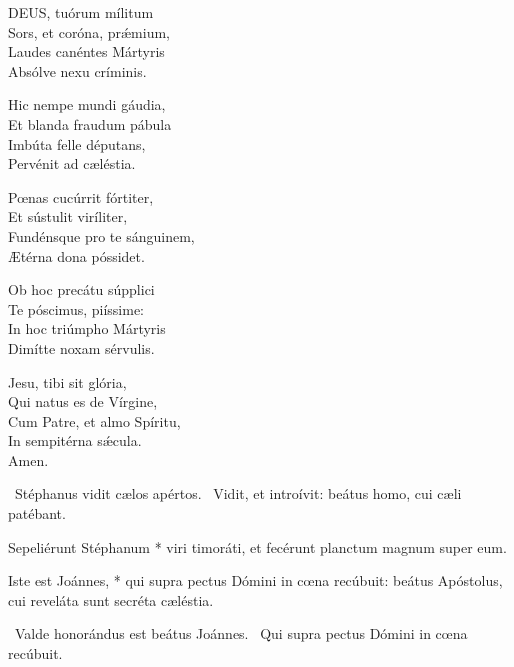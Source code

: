 \lettrine[lines=2]{D}{EUS}, tuórum mílitum\\
Sors, et coróna, prǽmium,\\
Laudes canéntes Mártyris\\
Absólve nexu críminis.

Hic nempe mundi gáudia,\\
Et blanda fraudum pábula\\
Imbúta felle députans,\\
Pervénit ad cæléstia.

Pœnas cucúrrit fórtiter,\\
Et sústulit viríliter,\\
Fundénsque pro te sánguinem,\\
Ætérna dona póssidet.

Ob hoc precátu súpplici\\
Te póscimus, piíssime:\\
In hoc triúmpho Mártyris\\
Dimítte noxam sérvulis.

Jesu, tibi sit glória,\\
Qui natus es de Vírgine,\\
Cum Patre, et almo Spíritu,\\
In sempitérna sǽcula.\\
Amen.

\V\ Stéphanus vidit cælos apértos. \R\ Vidit, et introívit: beátus homo, cui cæli patébant.

 Sepeliérunt Stéphanum * viri timoráti, et fecérunt planctum magnum super eum.



\sectionornament






 Iste est Joánnes, * qui supra pectus Dómini in cœna recúbuit: beátus Apóstolus, cui reveláta sunt secréta cæléstia.

\V\ Valde honorándus est beátus Joánnes. \R\ Qui supra pectus Dómini in cœna recúbuit.

